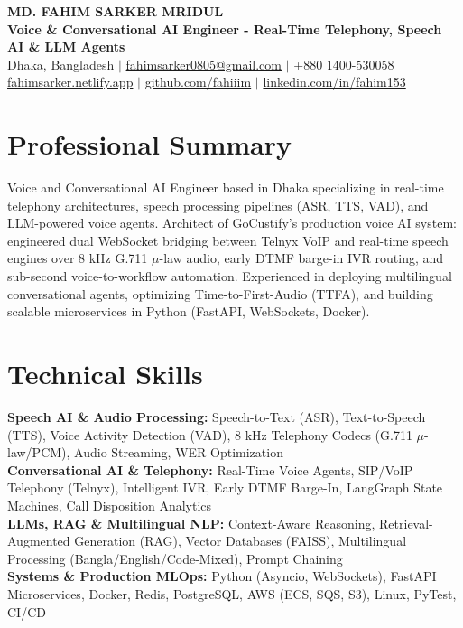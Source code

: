 \documentclass[9.5pt,a4paper]{article}
\begin{document}
{\centering
    {\Large \textbf{MD. FAHIM SARKER MRIDUL}}\\[1pt]
    \textbf{Voice \& Conversational AI Engineer - Real-Time Telephony, Speech AI \& LLM Agents}\\[1pt]
    Dhaka, Bangladesh \;$\vert$\; \href{mailto:fahimsarker0805@gmail.com}{fahimsarker0805@gmail.com} \;$\vert$\; +880 1400-530058\\[1pt]
    \href{https://fahimsarker.netlify.app}{fahimsarker.netlify.app} \;$\vert$\; \href{https://github.com/fahiiim}{github.com/fahiiim} \;$\vert$\; \href{https://linkedin.com/in/fahim153}{linkedin.com/in/fahim153}\par
}

\vspace{-4.5pt}
\section*{Professional Summary}
Voice and Conversational AI Engineer based in Dhaka specializing in real-time telephony architectures, speech processing pipelines (ASR, TTS, VAD), and LLM-powered voice agents. Architect of GoCustify's production voice AI system: engineered dual WebSocket bridging between Telnyx VoIP and real-time speech engines over 8 kHz G.711 $\mu$-law audio, early DTMF barge-in IVR routing, and sub-second voice-to-workflow automation. Experienced in deploying multilingual conversational agents, optimizing Time-to-First-Audio (TTFA), and building scalable microservices in Python (FastAPI, WebSockets, Docker).

\section*{Technical Skills}
\noindent
\textbf{Speech AI \& Audio Processing:} Speech-to-Text (ASR), Text-to-Speech (TTS), Voice Activity Detection (VAD), 8 kHz Telephony Codecs (G.711 $\mu$-law/PCM), Audio Streaming, WER Optimization\\
\textbf{Conversational AI \& Telephony:} Real-Time Voice Agents, SIP/VoIP Telephony (Telnyx), Intelligent IVR, Early DTMF Barge-In, LangGraph State Machines, Call Disposition Analytics\\
\textbf{LLMs, RAG \& Multilingual NLP:} Context-Aware Reasoning, Retrieval-Augmented Generation (RAG), Vector Databases (FAISS), Multilingual Processing (Bangla/English/Code-Mixed), Prompt Chaining\\
\textbf{Systems \& Production MLOps:} Python (Asyncio, WebSockets), FastAPI Microservices, Docker, Redis, PostgreSQL, AWS (ECS, SQS, S3), Linux, PyTest, CI/CD
\end{document}
